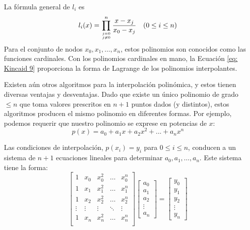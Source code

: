 La fórmula general de \( l_i \) es
\begin{equation}
    \label{eq: Kincaid 10}
    l_i(x) = \prod_{j = 0 \atop j \neq 0}^{n} \frac{x - x_j}{x_0 - x_j} \quad (0 \leq i \leq n)
\end{equation}
Para el conjunto de nodos \( x_0, x_1, \ldots, x_n \), estos polinomios son conocidos como las funciones cardinales. Con los polinomios cardinales en mano, la Ecuación \ref{eq: Kincaid 9} proporciona la forma de Lagrange de los polinomios interpolantes.

Existen aún otros algoritmos para la interpolación polinómica, y estos tienen diversas ventajas y desventajas. Dado que existe un único polinomio de grado \(\leq n\) que toma valores prescritos en \(n + 1\) puntos dados (y distintos), estos algoritmos producen el mismo polinomio en diferentes formas. Por ejemplo, podemos requerir que nuestro polinomio se exprese en potencias de \(x\):
\begin{equation}
    \label{eq: Kincaid 11}
    p(x) = a_0 + a_1 x + a_2 x^2 + ... + a_n x^n
\end{equation}

Las condiciones de interpolación, \( p(x_i) = y_i \) para \( 0 \leq i \leq n \), conducen a un sistema de \( n + 1 \) ecuaciones lineales para determinar \( a_0, a_1, \dots, a_n \). Este sistema tiene la forma:
\begin{equation}
    \label{eq: Kincaid 12}
    \begin{bmatrix}
        1       &       x_0     &       x_0^2       &       \dots       &       x_0^n       \\
        1       &       x_1     &       x_1^2       &       \dots       &       x_1^n       \\
        1       &       x_2     &       x_2^2       &       \dots       &       x_2^n       \\
        \vdots  &       \vdots  &       \vdots      &       \ddots      &       \vdots      \\
        1       &       x_n     &       x_n^2       &       \dots       &       x_n^n       \\
    \end{bmatrix}
    \begin{bmatrix}
        a_0 \\
        a_1 \\
        a_2 \\
        \vdots \\
        a_n
    \end{bmatrix} = 
    \begin{bmatrix}
        y_0 \\
        y_1 \\
        y_2 \\
        \vdots \\
        y_n 
    \end{bmatrix}
\end{equation}

